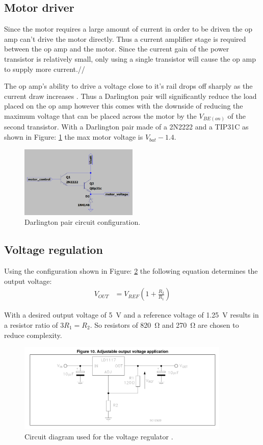 \clearpage
\subsection{Motor driver}
Since the motor requires a large amount of current in order to be driven the op amp can't drive the motor directly. Thus a current amplifier stage is required between the op amp and the motor. Since the current gain of the power transistor is relatively small, only using a single transistor will cause the op amp to supply more current.//

The op amp's ability to drive a voltage close to it's rail drops off sharply as the current draw increases \cite{TLC2272}. Thus a Darlington pair will significantly reduce the load placed on the op amp however this comes with the downside of reducing the maximum voltage that can be placed across the motor by the $V_{BE(on)}$ of the second transistor. With a Darlington pair made of a 2N2222 and a TIP31C as shown in Figure: \ref{fig:mtrctrl_darling} the max motor voltage is $V_{bat} - 1.4$.

\begin{figure}[H]
\centering
\includegraphics[width =0.5\textwidth]{./Figures/Mtr_Ctrl_Darling_Cir.png}
\caption{Darlington pair circuit configuration.}
\label{fig:mtrctrl_darling}
\end{figure} 

\clearpage
\subsection{Voltage regulation}
Using the configuration shown in Figure: \ref{fig:volt_reg_diag} the following equation determines the output voltage:
\begin{align*}
V_{OUT} &= V_{REF} \left(1+\frac{R_2}{R_1}\right)
\end{align*}

With a desired output voltage of \SI{5}{\volt} and a reference voltage of \SI{1.25}{\volt} results in a resistor ratio of $3R_1 = R_2$. So resistors of \SI{820}{\ohm} and \SI{270}{\ohm} are chosen to reduce complexity.

\begin{figure}[H]
\centering
\includegraphics[width = 0.9\textwidth]{./Figures/Volt_Reg_Diag.png}
\caption{Circuit diagram used for the voltage regulator \cite{LD1117}.}
\label{fig:volt_reg_diag}
\end{figure}








